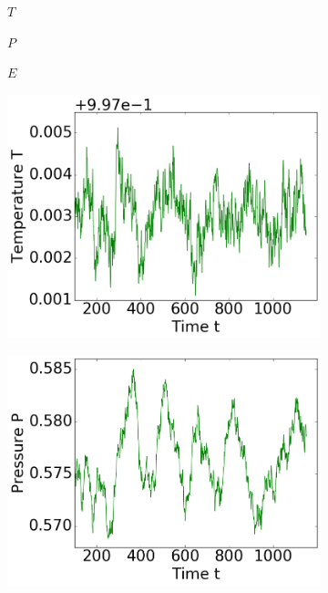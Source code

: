 \begin{figure}[ht]
\hfill
\begin{subfigure}{0.3\textwidth}
\centering
$T$
\end{subfigure}
\hfill
\begin{subfigure}{0.3\textwidth}
\centering
$P$
\end{subfigure}
\hfill
\begin{subfigure}{0.3\textwidth}
\centering
$E$
\end{subfigure}

\begin{subfigure}{0.3\textwidth}
\includegraphics[width=\textwidth]{../dat/avTemperature_T1d0_F20d0_M100.png}
\end{subfigure}
\hfill
\begin{subfigure}{0.3\textwidth}
\includegraphics[width=\textwidth]{../dat/avPressure_T1d0_F20d0_M100.png}

\end{subfigure}
\end{figure}
